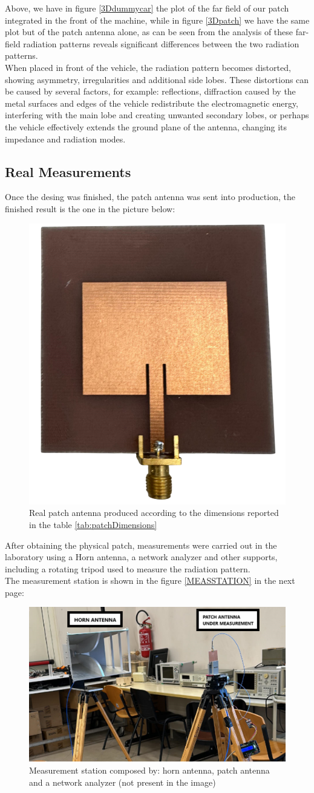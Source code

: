 \documentclass[]{article}
\begin{document}
Above, we have in figure \eqref{3Ddummycar} the plot of the far field of our patch integrated in the front of the machine, while in figure \eqref{3Dpatch} we have the same plot but of the patch antenna alone, as can be seen from the analysis of these far-field radiation patterns reveals significant differences between the two radiation patterns.\\
When placed in front of the vehicle, the radiation pattern becomes distorted, showing asymmetry, irregularities and additional side lobes. These distortions can be caused by several factors, for example: reflections, diffraction caused by the metal surfaces and edges of the vehicle redistribute the electromagnetic energy, interfering with the main lobe and creating unwanted secondary lobes, or perhaps the vehicle effectively extends the ground plane of the antenna, changing its impedance and radiation modes. 



\subsection{Real Measurements}
Once the desing was finished, the patch antenna was sent into production, the finished result is the one in the picture below:
\begin{figure}[h]
	\centering
	\includegraphics[width=0.35\linewidth]{img/img12}
	\caption{Real patch antenna produced according to the dimensions reported in the table \eqref{tab:patchDimensions}}
	\label{realpatch}
\end{figure}


After obtaining the physical patch, measurements were carried out in the laboratory using a Horn antenna, a network analyzer and other supports, including a rotating tripod used to measure the radiation pattern.\\
The measurement station is shown in the figure \eqref{MEASSTATION} in the next page:
\begin{figure}[H]
	\centering
	\includegraphics[width=0.5\linewidth]{img/img13}
	\caption{Measurement station composed by: horn antenna, patch antenna and a network analyzer (not present in the image)}
	\label{MEASSTATION}
\end{figure}
\end{document}
